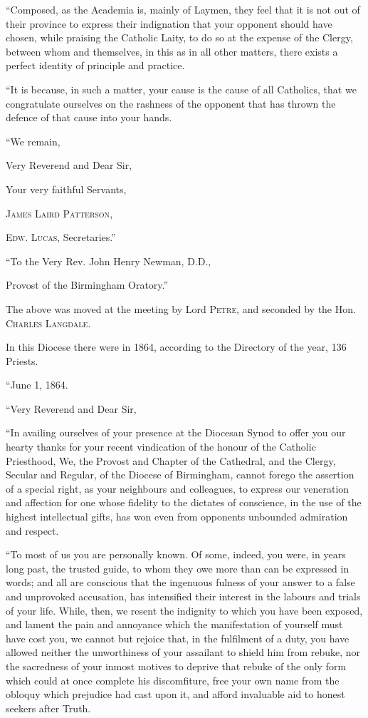 ``Composed, as the Academia is, mainly of Laymen, they feel that
it is not out of their province to express their indignation that your
opponent should have chosen, while praising the Catholic Laity, to do so
at the expense of the Clergy, between whom and themselves, in this as in
all other matters, there exists a perfect identity of principle and
practice.

``It is because, in such a matter, your cause is the cause of all
Catholics, that we congratulate ourselves on the rashness of the
opponent that has thrown the defence of that cause into your hands.

``We remain,

Very Reverend and Dear Sir,

Your very faithful Servants,

J\textsc{ames} L\textsc{aird} P\textsc{atterson},

E\textsc{dw}. L\textsc{ucas}, Secretaries.''

``To the Very Rev. John Henry Newman, D.D.,

Provost of the Birmingham Oratory.''

The above was moved at the meeting by Lord P\textsc{etre}, and seconded by the
Hon. C\textsc{harles} L\textsc{angdale}.


In this Diocese there were in 1864, according to the Directory of the
year, 136 Priests.

``June 1, 1864.

``Very Reverend and Dear Sir,

``In availing ourselves of your presence at the Diocesan Synod to
offer you our hearty thanks for your recent vindication of the honour of
the Catholic Priesthood, We, the Provost and Chapter of the Cathedral,
and the Clergy, Secular and Regular, of the Diocese of Birmingham,
cannot forego the assertion of a special right, as your neighbours and
colleagues, to express our veneration and affection for one whose
fidelity to the dictates of conscience, in the use of the highest
intellectual gifts, has won even from opponents unbounded admiration and
respect.

``To most of us you are personally known. Of some, indeed, you
were, in years long past, the trusted guide, to whom they owe more than
can be expressed in words; and all are conscious that the ingenuous
fulness of your answer to a false and unprovoked accusation, has intensified
their interest in the labours and trials of your life. While, then, we
resent the indignity to which you have been exposed, and lament the pain
and annoyance which the manifestation of yourself must have cost you, we
cannot but rejoice that, in the fulfilment of a duty, you have allowed
neither the unworthiness of your assailant to shield him from rebuke,
nor the sacredness of your inmost motives to deprive that rebuke of the
only form which could at once complete his discomfiture, free your own
name from the obloquy which prejudice had cast upon it, and afford
invaluable aid to honest seekers after Truth.

